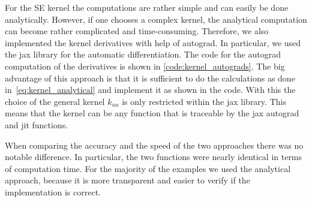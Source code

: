 \documentclass{article}
\begin{document}
For the SE kernel the computations are rather simple and can easily be done analytically. However, if one chooses a complex kernel, the analytical computation can become rather complicated and time-consuming. Therefore, we also implemented the kernel derivatives with help of autograd. In particular, we used the jax library for the automatic differentiation. The code for the autograd computation of the derivatives is shown in \ref{code:kernel_autograds}. The big advantage of this approach is that it is sufficient to do the calculations as done in~\ref{eq:kernel_analytical} and implement it as shown in the code. With this the choice of the general kernel $k_{uu}$ is only restricted within the jax library. This means that the kernel can be any function that is traceable by the jax autograd and jit functions. 

When comparing the accuracy and the speed of the two approaches there was no notable difference. In particular, the two functions were nearly identical in terms of computation time. For the majority of the examples we used the analytical approach, because it is more transparent and easier to verify if the implementation is correct.
\end{document}

